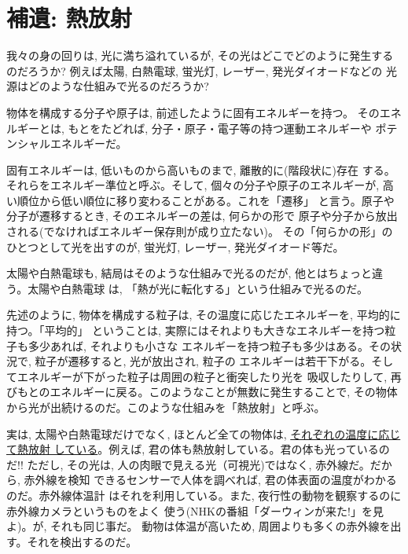 \section{補遺: 熱放射}\label{sect:thermalemission}

我々の身の回りは, 光に満ち溢れているが, その光はどこでどのように発生する
のだろうか? 例えば太陽, 白熱電球, 蛍光灯, レーザー, 発光ダイオードなどの
光源はどのような仕組みで光るのだろうか?

物体を構成する分子や原子は, 前述したように固有エネルギーを持つ。
そのエネルギーとは, もとをたどれば, 分子・原子・電子等の持つ運動エネルギーや
ポテンシャルエネルギーだ。

固有エネルギーは, 低いものから高いものまで, 離散的に(階段状に)存在
する。それらをエネルギー準位と呼ぶ。そして, 個々の分子や原子のエネルギーが, 
高い順位から低い順位に移り変わることがある。これを「遷移」
と言う。原子や分子が遷移するとき, そのエネルギーの差は, 何らかの形で
原子や分子から放出される(でなければエネルギー保存則が成り立たない)。
その「何らかの形」のひとつとして光を出すのが, 蛍光灯, レーザー, 
発光ダイオード等だ。

太陽や白熱電球も, 結局はそのような仕組みで光るのだが, 他とはちょっと違う。太陽や白熱電球
は, 「熱が光に転化する」という仕組みで光るのだ。

先述のように, 物体を構成する粒子は, その温度に応じたエネルギーを, 平均的に持つ。「平均的」
ということは, 実際にはそれよりも大きなエネルギーを持つ粒子も多少あれば, それよりも小さな
エネルギーを持つ粒子も多少はある。その状況で, 粒子が遷移すると, 光が放出され, 粒子の
エネルギーは若干下がる。そしてエネルギーが下がった粒子は周囲の粒子と衝突したり光を
吸収したりして, 再びもとのエネルギーに戻る。このようなことが無数に発生することで, 
その物体から光が出続けるのだ。このような仕組みを「熱放射」と呼ぶ。

実は, 太陽や白熱電球だけでなく, ほとんど全ての物体は, \underline{それぞれの温度に応じて熱放射
している}。例えば, 君の体も熱放射している。君の体も光っているのだ!! ただし, 
その光は, 人の肉眼で見える光（可視光)ではなく, 赤外線だ。だから, 赤外線を検知
できるセンサーで人体を調べれば, 君の体表面の温度がわかるのだ。赤外線体温計
はそれを利用している。また, 夜行性の動物を観察するのに赤外線カメラというものをよく
使う(NHKの番組「ダーウィンが来た!」を見よ)。が, それも同じ事だ。
動物は体温が高いため, 周囲よりも多くの赤外線を出す。それを検出するのだ。



